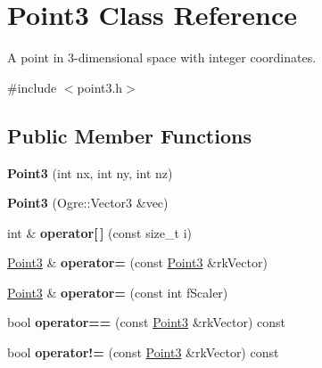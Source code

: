 \hypertarget{classPoint3}{
\section{\-Point3 \-Class \-Reference}
\label{d4/d36/classPoint3}
}


\-A point in 3-\/dimensional space with integer coordinates.  




{\ttfamily \#include $<$point3.\-h$>$}

\subsection*{\-Public \-Member \-Functions}
\begin{DoxyCompactItemize}
\item 
\hypertarget{classPoint3_a52d26a774845426ce1213cb054bbb49f}{
{\bfseries \-Point3} (int nx, int ny, int nz)}
\label{d4/d36/classPoint3_a52d26a774845426ce1213cb054bbb49f}

\item 
\hypertarget{classPoint3_a355cf683ab918246c3ca76a3b59dfc36}{
{\bfseries \-Point3} (\-Ogre\-::\-Vector3 \&vec)}
\label{d4/d36/classPoint3_a355cf683ab918246c3ca76a3b59dfc36}

\item 
\hypertarget{classPoint3_a4c588c1fdc76b45f14bda592c34aeac7}{
int \& {\bfseries operator\mbox{[}$\,$\mbox{]}} (const size\-\_\-t i)}
\label{d4/d36/classPoint3_a4c588c1fdc76b45f14bda592c34aeac7}

\item 
\hypertarget{classPoint3_a2646347bf4129adae0f21435ff828779}{
\hyperlink{classPoint3}{\-Point3} \& {\bfseries operator=} (const \hyperlink{classPoint3}{\-Point3} \&rk\-Vector)}
\label{d4/d36/classPoint3_a2646347bf4129adae0f21435ff828779}

\item 
\hypertarget{classPoint3_a3cb9291495bde0df0b208a44c32dc65c}{
\hyperlink{classPoint3}{\-Point3} \& {\bfseries operator=} (const int f\-Scaler)}
\label{d4/d36/classPoint3_a3cb9291495bde0df0b208a44c32dc65c}

\item 
\hypertarget{classPoint3_a11a2eb493ecbd571b390cda2ca45fce4}{
bool {\bfseries operator==} (const \hyperlink{classPoint3}{\-Point3} \&rk\-Vector) const }
\label{d4/d36/classPoint3_a11a2eb493ecbd571b390cda2ca45fce4}

\item 
\hypertarget{classPoint3_ac1aad392227df307ca3aaa4d021c6e64}{
bool {\bfseries operator!=} (const \hyperlink{classPoint3}{\-Point3} \&rk\-Vector) const }
\label{d4/d36/classPoint3_ac1aad392227df307ca3aaa4d021c6e64}


\end{DoxyCompactItemize}
